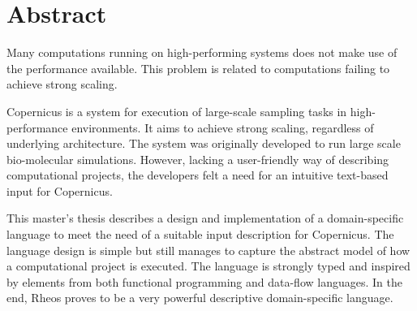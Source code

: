 \begingroup
\let\clearpage\relax
\let\cleardoublepage\relax
\let\cleardoublepage\relax

\chapter*{Abstract}

Many computations running on high-performing systems does not make use
of the performance available. This problem is related to computations
failing to achieve strong scaling.

Copernicus is a system for execution of large-scale sampling tasks in
high-performance environments. It aims to achieve strong scaling,
regardless of underlying architecture. The system was originally
developed to run large scale bio-molecular simulations. However,
lacking a user-friendly way of describing computational projects, the
developers felt a need for an intuitive text-based input for
Copernicus.

This master's thesis describes a design and implementation of a
domain-specific language to meet the need of a suitable input
description for Copernicus. The language design is simple but still
manages to capture the abstract model of how a computational project
is executed. The language is strongly typed and inspired by elements
from both functional programming and data-flow languages. In the end,
Rheos proves to be a very powerful descriptive domain-specific
language.

\endgroup			

\vfill
